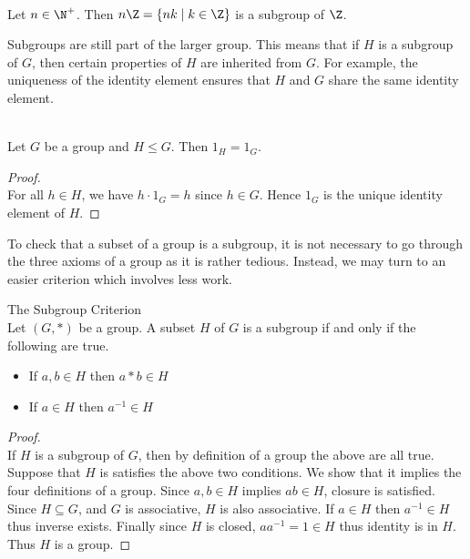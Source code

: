 \documentclass[a4paper]{article}
\begin{document}
\begin{eg}{}{}\\
Let $n\in\N^+$. Then $n\Z=\{nk\;|\;k\in\Z\}$ is a subgroup of $\Z$. 
\end{eg}

Subgroups are still part of the larger group. This means that if $H$ is a subgroup of $G$, then certain properties of $H$ are inherited from $G$. For example, the uniqueness of the identity element ensures that $H$ and $G$ share the same identity element. 

\begin{lmm}{}{}\\
Let $G$ be a group and $H\leq G$. Then $1_H=1_G$. 
\begin{proof}\\
For all $h\in H$, we have $h\cdot 1_G=h$ since $h\in G$. Hence $1_G$ is the unique identity element of $H$. 
\end{proof}
\end{lmm}

To check that a subset of a group is a subgroup, it is not necessary to go through the three axioms of a group as it is rather tedious. Instead, we may turn to an easier criterion which involves less work. 

\begin{prp}{The Subgroup Criterion}{}\\
Let $(G,\ast)$ be a group. A subset $H$ of $G$ is a subgroup if and only if the following are true. 
\begin{itemize}
\item If $a,b\in H$ then $a\ast b\in H$
\item If $a\in H$ then $a^{-1}\in H$
\end{itemize}
\begin{proof}\\
If $H$ is a subgroup of $G$, then by definition of a group the above are all true.\\
Suppose that $H$ is satisfies the above two conditions. We show that it implies the four definitions of a group. Since $a,b\in H$ implies $ab\in H$, closure is satisfied. Since $H\subseteq G$, and $G$ is associative, $H$ is also associative. If $a\in H$ then $a^{-1}\in H$ thus inverse exists. Finally since $H$ is closed, $aa^{-1}=1\in H$ thus identity is in $H$. Thus $H$ is a group. 
\end{proof}
\end{prp}
\end{document}
